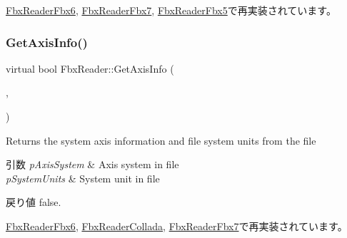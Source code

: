 \hyperlink{class_fbx_reader_fbx6_a9f3d0e6b7722581f2028be9b94f1b933}{Fbx\+Reader\+Fbx6}, \hyperlink{class_fbx_reader_fbx7_a6f6a6de8ff027f552341f0909bdf54b4}{Fbx\+Reader\+Fbx7}, \hyperlink{class_fbx_reader_fbx5_ad48fa87e086b236db57f57eed5f50ddb}{Fbx\+Reader\+Fbx5}で再実装されています。

\mbox{\label{class_fbx_reader_a73e58c3f7734250f0f8ffaef96b2df3f}} 
\subsubsection{\texorpdfstring{Get\+Axis\+Info()}{GetAxisInfo()}}
{\footnotesize\ttfamily virtual bool Fbx\+Reader\+::\+Get\+Axis\+Info (\begin{DoxyParamCaption}\item[{\hyperlink{class_fbx_axis_system}{Fbx\+Axis\+System} $\ast$}]{,  }\item[{\hyperlink{class_fbx_system_unit}{Fbx\+System\+Unit} $\ast$}]{ }\end{DoxyParamCaption})\hspace{0.3cm}{\ttfamily [virtual]}}

Returns the system axis information and file system units from the file 
\begin{DoxyParams}{引数}
{\em p\+Axis\+System} & Axis system in file \\
\hline
{\em p\+System\+Units} & System unit in file \\
\hline
\end{DoxyParams}
\begin{DoxyReturn}{戻り値}
{\ttfamily false}. 
\end{DoxyReturn}


\hyperlink{class_fbx_reader_fbx6_ab8e2b6c8c2b0b081b615cd4969af32cb}{Fbx\+Reader\+Fbx6}, \hyperlink{class_fbx_reader_collada_aed6cb43bb8262e63260088ad8abcf2e6}{Fbx\+Reader\+Collada}, \hyperlink{class_fbx_reader_fbx7_aa57c715aa82bd42dbe1df860296ad8be}{Fbx\+Reader\+Fbx7}で再実装されています。

\mbox{\label{class_fbx_reader_ab3fb0fb0e0c311cb58e15092c82637ee}} 
